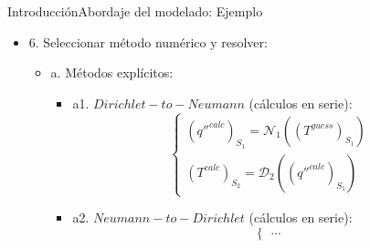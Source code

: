 \begin{frame}{Introducción}{Abordaje del modelado: Ejemplo}
\begin{itemize}
\item 6. Seleccionar método numérico y resolver: 
  \begin{itemize}
  \item a. Métodos explícitos:
    \begin{itemize}
    \item a1. $Dirichlet-to-Neumann$ (cálculos en serie):
      \begin{equation*}
      \left\{\begin{matrix}
      (q''^{calc})_{S_1} = \mathscr{N}_1\left ((T^{guess})_{S_1}\right ) \\
      (T^{calc})_{S_2} = \mathscr{D}_2\left ((q''^{calc})_{S_1}\right )
      \end{matrix}\right.
      \end{equation*}
    \item <2-> a2. $Neumann-to-Dirichlet$ (cálculos en serie):
      \begin{equation*}
      \left\{\begin{matrix}
      ...
      \end{matrix}\right.
      \end{equation*}
    \end{itemize}
  \end{itemize}
\end{itemize}

\end{frame}

